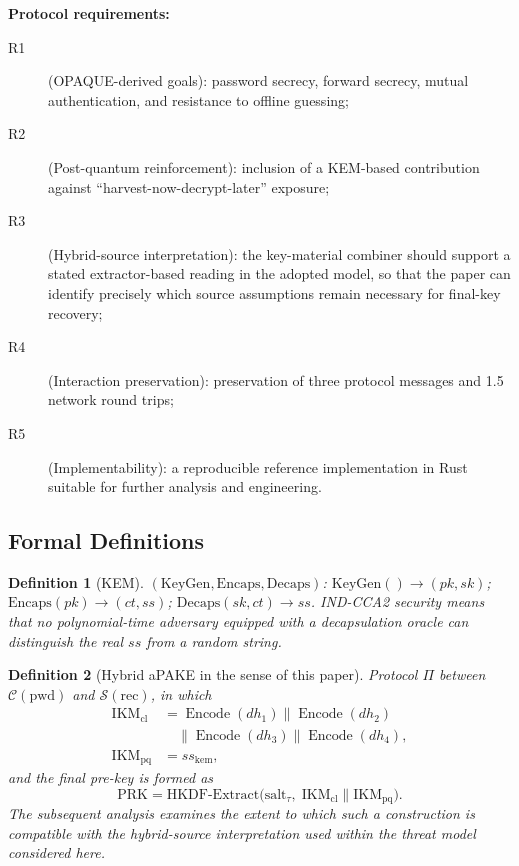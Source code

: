 \documentclass[preprint,12pt]{elsarticle}
\newtheorem{definition}{Definition}[section]
\theoremstyle{remark}
\begin{document}
\textbf{Protocol requirements:}
\begin{description}
  \item[R1] (OPAQUE-derived goals): password secrecy, forward secrecy,
        mutual authentication, and resistance to offline guessing;
  \item[R2] (Post-quantum reinforcement): inclusion of a KEM-based
        contribution against ``harvest-now-decrypt-later'' exposure;
  \item[R3] (Hybrid-source interpretation): the key-material combiner
        should support a stated extractor-based reading in the adopted
        model, so that the paper can identify precisely which source
        assumptions remain necessary for final-key recovery;
  \item[R4] (Interaction preservation): preservation of three protocol
        messages and 1.5 network round trips;
  \item[R5] (Implementability): a reproducible reference implementation
        in Rust suitable for further analysis and engineering.
\end{description}

\subsection{Formal Definitions}

\begin{definition}[KEM]
$(\mathrm{KeyGen}, \mathrm{Encaps}, \mathrm{Decaps})$:
$\mathrm{KeyGen}() \to (pk, sk)$;
$\mathrm{Encaps}(pk) \to (ct, ss)$;
$\mathrm{Decaps}(sk, ct) \to ss$.
IND-CCA2 security means that no polynomial-time adversary equipped with
a decapsulation oracle can distinguish the real $ss$ from a random
string.
\end{definition}

\begin{definition}[Hybrid aPAKE in the sense of this paper]
Protocol $\Pi$ between $\mathcal{C}(\mathrm{pwd})$ and
$\mathcal{S}(\mathrm{rec})$, in which
\[
  \begin{aligned}
    \mathrm{IKM}_{\mathrm{cl}}
      &= \operatorname{Encode}(dh_1) \| \operatorname{Encode}(dh_2)\\
      &\quad \| \operatorname{Encode}(dh_3) \|
        \operatorname{Encode}(dh_4),\\
    \mathrm{IKM}_{\mathrm{pq}} &= ss_{\mathrm{kem}},
  \end{aligned}
\]
and the final pre-key is formed as
\[
  \mathrm{PRK} = \mathrm{HKDF\text{-}Extract}\!\bigl(
    \mathrm{salt}_{\tau},\;
    \mathrm{IKM}_{\mathrm{cl}} \| \mathrm{IKM}_{\mathrm{pq}}\bigr).
\]
The subsequent analysis examines the extent to which such a
construction is compatible with the hybrid-source interpretation used
within the threat model considered here.
\end{definition}
\end{document}
